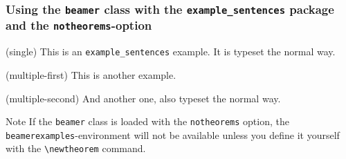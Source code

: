 \documentclass[notheorems]{beamer}
\begin{document}
	\begin{frame}
		\frametitle{Using the \texttt{beamer} class with the \texttt{example\_sentences} package and the \texttt{notheorems}-option}
		\begin{examples}
			\item(single) This is an \texttt{example\_sentences} example. It is typeset the normal way.
		\end{examples}
		\begin{examples}
		 	 \item(multiple-first) This is another example.
		 	 \item(multiple-second) And another one, also typeset the normal way.
		\end{examples}
		\begin{block}{Note}
			If the \texttt{beamer} class is loaded with the \texttt{notheorems} option, the \texttt{beamerexamples}-environment will not be available unless you define it yourself with the
    \texttt{\textbackslash{}newtheorem} command.
		\end{block} 
	\end{frame}
\end{document}

